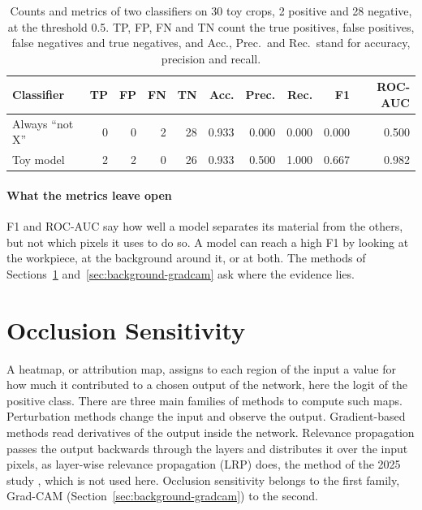 \begin{table}[htbp]
\centering
\caption[Metrics of two classifiers on 30 toy crops]{Counts and metrics of two
classifiers on 30 toy crops, 2 positive and 28 negative, at the threshold 0.5. TP, FP,
FN and TN count the true positives, false positives, false negatives and true negatives,
and Acc., Prec.\ and Rec.\ stand for accuracy, precision and recall.}
\label{tab:bg-toy-metrics}
\small
\setlength{\tabcolsep}{4pt}
\begin{tabular}{lrrrrrrrrr}
\toprule
Classifier & TP & FP & FN & TN &
Acc. & Prec. & Rec. & F1 & ROC-AUC \\
\midrule
Always ``not X'' & 0 & 0 & 2 & 28 & 0.933 & 0.000 & 0.000 & 0.000 & 0.500 \\
Toy model & 2 & 2 & 0 & 26 & 0.933 & 0.500 & 1.000 & 0.667 & 0.982 \\
\bottomrule
\end{tabular}
\end{table}

\paragraph{What the metrics leave open}
F1 and ROC-AUC say how well a model separates its material from the others, but not
which pixels it uses to do so. A model can reach a high F1 by looking at the
workpiece, at the background around it, or at both. The methods of
Sections~\ref{sec:background-occlusion} and~\ref{sec:background-gradcam} ask where the
evidence lies.

\section{Occlusion Sensitivity}
\label{sec:background-occlusion}

A heatmap, or attribution map, assigns to each region of the input a value for how much
it contributed to a chosen output of the network, here the logit of the positive
class. There are three main families of methods to compute such maps. Perturbation methods
change the input and observe the output. Gradient-based methods read derivatives of the
output inside the network. Relevance propagation passes the output backwards through the
layers and distributes it over the input pixels, as layer-wise relevance propagation
(LRP) \citep{bach2015lrp, montavon2019lrp} does, the method of the 2025
study \citep{schneidereitYOLOv8}, which is not used here. Occlusion sensitivity belongs
to the first family, Grad-CAM (Section~\ref{sec:background-gradcam}) to the second.

